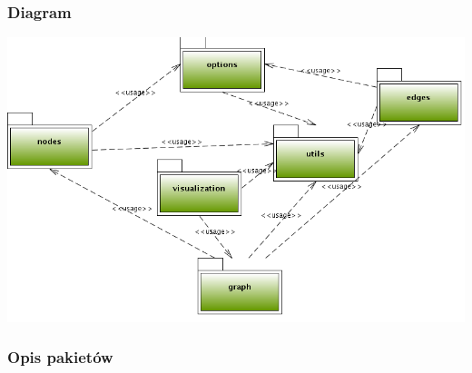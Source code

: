 \subsubsection{Diagram}
 \includegraphics[width=\linewidth]{./modelowanie/OV_UML/PackageDiagram.png}

\newpage
\subsubsection{Opis pakietów}


